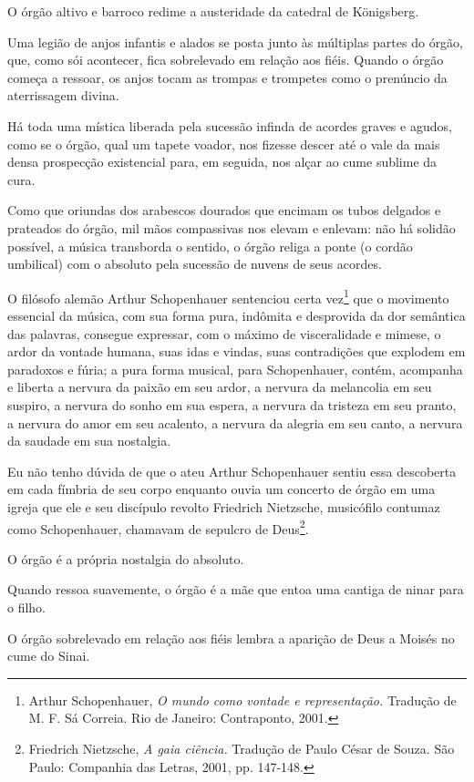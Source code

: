 O órgão altivo e barroco redime a austeridade da catedral de Königsberg.

Uma legião de anjos infantis e alados se posta junto às múltiplas partes
do órgão, que, como sói acontecer, fica sobrelevado em relação aos
fiéis. Quando o órgão começa a ressoar, os anjos tocam as trompas e
trompetes como o prenúncio da aterrissagem divina.

Há toda uma mística liberada pela sucessão infinda de acordes graves e
agudos, como se o órgão, qual um tapete voador, nos fizesse descer até o
vale da mais densa prospecção existencial para, em seguida, nos alçar ao
cume sublime da cura.

Como que oriundas dos arabescos dourados que encimam os tubos delgados e
prateados do órgão, mil mãos compassivas nos elevam e enlevam: não há
solidão possível, a música transborda o sentido, o órgão religa a ponte
(o cordão umbilical) com o absoluto pela sucessão de nuvens de seus
acordes.

O filósofo alemão Arthur Schopenhauer sentenciou certa vez\footnote{Arthur
  Schopenhauer, \emph{O mundo como vontade e representação.} Tradução de
  M. F. Sá Correia. Rio de Janeiro: Contraponto, 2001.} que o movimento
essencial da música, com sua forma pura, indômita e desprovida da dor
semântica das palavras, consegue expressar, com o máximo de
visceralidade e mimese, o ardor da vontade humana, suas idas e vindas,
suas contradições que explodem em paradoxos e fúria; a pura forma
musical, para Schopenhauer, contém, acompanha e liberta a nervura da
paixão em seu ardor, a nervura da melancolia em seu suspiro, a nervura
do sonho em sua espera, a nervura da tristeza em seu pranto, a nervura
do amor em seu acalento, a nervura da alegria em seu canto, a nervura da
saudade em sua nostalgia.

Eu não tenho dúvida de que o ateu Arthur Schopenhauer sentiu essa
descoberta em cada fímbria de seu corpo enquanto ouvia um concerto de
órgão em uma igreja que ele e seu discípulo revolto Friedrich Nietzsche,
musicófilo contumaz como Schopenhauer, chamavam de sepulcro de
Deus\footnote{Friedrich Nietzsche, \emph{A gaia ciência.} Tradução de
  Paulo César de Souza. São Paulo: Companhia das Letras, 2001, pp.
  147-148.}.

O órgão é a própria nostalgia do absoluto.

Quando ressoa suavemente, o órgão é a mãe que entoa uma cantiga de ninar
para o filho.

O órgão sobrelevado em relação aos fiéis lembra a aparição de Deus a
Moisés no cume do Sinai.


